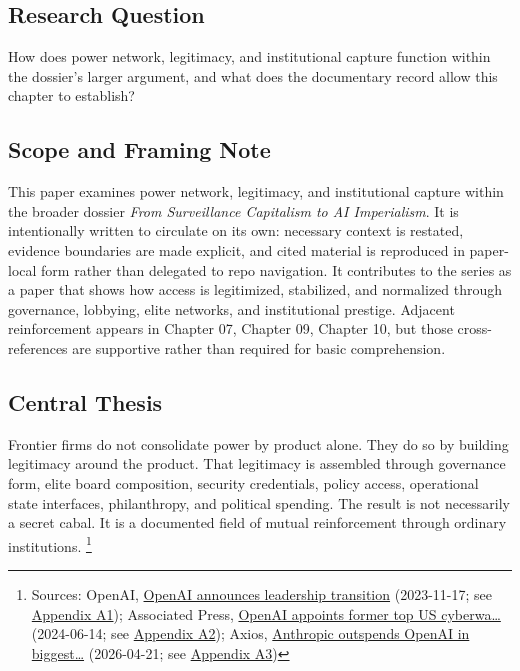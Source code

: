 \documentclass[
  american,
  11pt,
  letterpaper,
]{article}
\begin{document}
\subsection{Research Question}\label{research-question-8}

How does power network, legitimacy, and institutional capture function
within the dossier's larger argument, and what does the documentary
record allow this chapter to establish?

\subsection{Scope and Framing Note}\label{scope-and-framing-note-8}

This paper examines power network, legitimacy, and institutional capture
within the broader dossier \emph{From Surveillance Capitalism to AI
Imperialism}. It is intentionally written to circulate on its own:
necessary context is restated, evidence boundaries are made explicit,
and cited material is reproduced in paper-local form rather than
delegated to repo navigation. It contributes to the series as a paper
that shows how access is legitimized, stabilized, and normalized through
governance, lobbying, elite networks, and institutional prestige.
Adjacent reinforcement appears in Chapter 07, Chapter 09, Chapter 10,
but those cross-references are supportive rather than required for basic
comprehension.

\subsection{Central Thesis}\label{central-thesis-8}

Frontier firms do not consolidate power by product alone. They do so by
building legitimacy around the product. That legitimacy is assembled
through governance form, elite board composition, security credentials,
policy access, operational state interfaces, philanthropy, and political
spending. The result is not necessarily a secret cabal. It is a
documented field of mutual reinforcement through ordinary institutions.
\footnote{Sources: OpenAI,
  \href{https://openai.com/index/openai-announces-leadership-transition/}{OpenAI
  announces leadership transition} (2023-11-17; see
  \hyperref[ch-08-appendix-a1-openai-announces-leadership-transition]{Appendix
  A1}); Associated Press,
  \href{https://apnews.com/article/6ef612a3a0fcaef05480bbd1ebbd79b1}{OpenAI
  appoints former top US cyberwa\ldots{}} (2024-06-14; see
  \hyperref[ch-08-appendix-a2-openai-appoints-former-top-us-cyberwarrior-paul-nakasone-to-its-board-of-directors]{Appendix
  A2}); Axios,
  \href{https://www.axios.com/2026/04/21/anthropic-outspends-openai-biggest-lobbying-quarter}{Anthropic
  outspends OpenAI in biggest\ldots{}} (2026-04-21; see
  \hyperref[ch-08-appendix-a3-anthropic-outspends-openai-in-biggest-ever-lobbying-quarter]{Appendix
  A3})}
\end{document}
